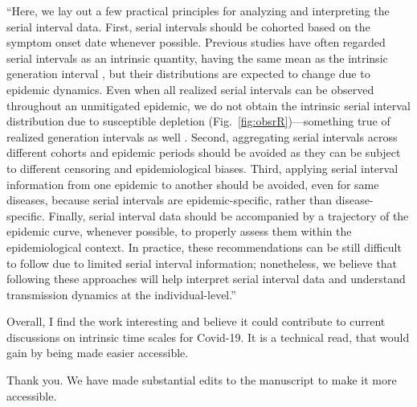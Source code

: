 \documentclass[12pt]{article}
\newcommand{\fref}[1]{Fig.~\ref{fig:#1}}
\newcommand{\revtext}{\textsf}
\begin{document}
``Here, we lay out a few practical principles for analyzing and interpreting the serial interval data.
First, serial intervals should be cohorted based on the symptom onset date whenever possible.
Previous studies have often regarded serial intervals as an intrinsic quantity, having the same mean as the intrinsic generation interval \citep{svensson2007note,klinkenberg2011correlation,champredon2018equivalence, britton2019estimation}, but their distributions are expected to change due to epidemic dynamics.
Even when all realized serial intervals can be observed throughout an unmitigated epidemic, we do not obtain the intrinsic serial interval distribution due to susceptible depletion (\fref{obsrR})---something true of realized generation intervals as well \citep{park2020inferring}.
Second, aggregating serial intervals across different cohorts and epidemic periods should be avoided as they can be subject to different censoring and epidemiological biases.
Third, applying serial interval information from one epidemic to another should be avoided, even for same diseases, because serial intervals are epidemic-specific, rather than disease-specific.
Finally, serial interval data should be accompanied by a trajectory of the epidemic curve, whenever possible, to properly assess them within the epidemiological context.
In practice, these recommendations can be still difficult to follow due to limited serial interval information;
nonetheless, we believe that following these approaches will help interpret serial interval data and understand transmission dynamics at the individual-level.''

\revtext{Overall, I find the work interesting and believe it could contribute to current discussions on intrinsic time scales for Covid-19. It is a technical read, that would gain by being made easier accessible.}

Thank you. We have made substantial edits to the manuscript to make it more accessible.


\end{document}
